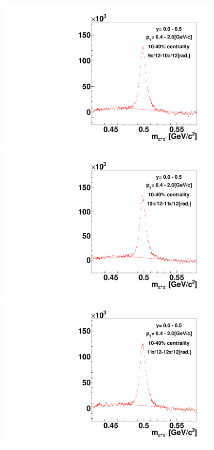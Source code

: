 \begin{figure}[h]
\includegraphics[width=0.14\linewidth]{chapterX/fig/ks_v2_sig/kf_ptslice0_cent1_ks_flow_phi10_rap0.pdf}
\includegraphics[width=0.14\linewidth]{chapterX/fig/ks_v2_sig/kf_ptslice0_cent1_ks_flow_phi11_rap0.pdf}
\includegraphics[width=0.14\linewidth]{chapterX/fig/ks_v2_sig/kf_ptslice0_cent1_ks_flow_phi12_rap0.pdf}


\end{figure}
